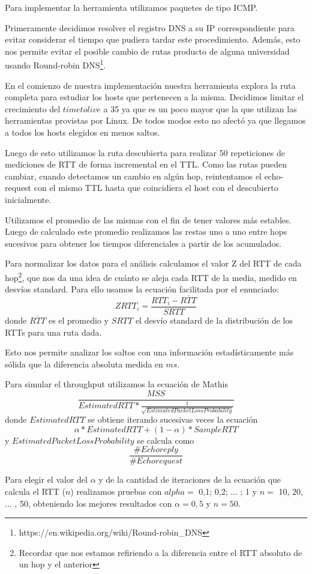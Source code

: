 Para implementar la herramienta utilizamos paquetes de tipo ICMP.

Primeramente decidimos resolver el registro DNS a su IP correspondiente para evitar considerar el tiempo que pudiera tardar este procedimiento. Además, esto nos permite evitar el posible cambio de rutas producto de alguna universidad usando Round-robin DNS\footnote{https://en.wikipedia.org/wiki/Round-robin\_DNS}.

En el comienzo de nuestra implementación nuestra herramienta explora la ruta completa para estudiar los hosts que pertenecen a la misma.
Decidimos limitar el crecimiento del $time to live$ a 35 ya que es un poco mayor que la que utilizan las herramientas provistas por Linux.
De todos modos esto no afectó ya que llegamos a todos los hosts elegidos en menos saltos.

Luego de esto utilizamos la ruta descubierta para realizar 50 repeticiones de mediciones de RTT de forma incremental en el TTL.
Como las rutas pueden cambiar, cuando detectamos un cambio en algún hop, reintentamos el echo-request con el mismo TTL hasta que coincidiera el host con el descubierto inicialmente.

Utilizamos el promedio de las mismas con el fin de tener valores más estables.
Luego de calculado este promedio realizamos las restas uno a uno entre hops sucesivos para obtener los tiempos diferenciales a partir de los acumulados.

Para normalizar los datos para el análisis calculamos el valor Z del RTT de cada hop\footnote{Recordar que nos estamos refiriendo a la diferencia entre el RTT absoluto de un hop y el anterior}, que nos da una idea de cuánto se aleja cada RTT de la media, medido en desvíos standard. Para ello usamos la ecuación facilitada por el enunciado: $$ ZRTT_i = \dfrac{RTT_i-\overline{RTT}}{SRTT}$$ donde $\overline{RTT}$ es el promedio y $SRTT$ el desvío standard de la distribución de los RTTs para una ruta dada.

Esto nos permite analizar los saltos con una información estadísticamente más sólida que la diferencia absoluta medida en $ms$.

Para simular el throughput utilizamos la ecuación de Mathis
$$\frac{MSS}{EstimatedRTT * \frac{1}{\sqrt{EstimatedPacketLossProbability}}}$$
donde $EstimatedRTT$ se obtiene iterando sucesivas veces la ecuación
$$\alpha * EstimatedRTT + (1 - \alpha) * SampleRTT$$
y $EstimatedPacketLossProbability$ se calcula como $$\frac{\#Echo reply}{\#Echo request}$$

Para elegir el valor del $\alpha$ y de la cantidad de iteraciones de la ecuación que calcula el RTT ($n$) realizamos pruebas con $alpha =$ 0,1; 0,2; ... ; 1 y $n =$ 10, 20, ... , 50, obteniendo los mejores resultados con $\alpha = 0,5$ y $n = 50$.